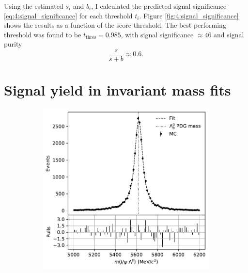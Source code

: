 Using the estimated $s_i$ and $b_i$, I calculated the predicted signal significance \eqref{eq:4:signal_significance} for each threshold $t_i$.
Figure \ref{fig:4:signal_significance} shows the results as a function of the score threshold.
The best performing threshold was found to be $t_\text{thres} = 0.985$, with signal significance $\approx 46$ and signal purity
\begin{equation}
	\frac{s}{s+b} \approx 0.6.
\end{equation}

\section{Signal yield in invariant mass fits}
\label{sec:4:performance_data}

\begin{figure}[t]
	\centering
	\begin{subfigure}{.45\textwidth}
		\includegraphics[width=\textwidth]{graphics/04-event_selection/MC_lambdab_hard_fit.pdf}
		\caption{}
		\label{fig:4:mc_fit}
	\end{subfigure}
	\begin{subfigure}{.45\textwidth}

\end{subfigure}
\end{figure}
